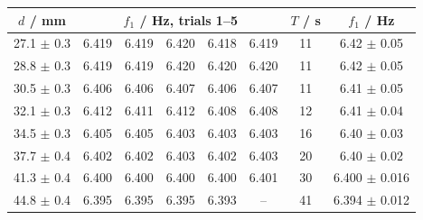 \begin{tabular}{@{}cccccccc@{}}
\toprule
$d$ / mm & \multicolumn{5}{c}{$f_1$ / Hz, trials 1--5} & $T$ / s & $f_1$ / Hz \\
\midrule
27.1 $\pm$ 0.3 & 6.419 & 6.419 & 6.420 & 6.418 & 6.419 & 11 & 6.42 $\pm$ 0.05 \\
28.8 $\pm$ 0.3 & 6.419 & 6.419 & 6.420 & 6.420 & 6.420 & 11 & 6.42 $\pm$ 0.05 \\
30.5 $\pm$ 0.3 & 6.406 & 6.406 & 6.407 & 6.406 & 6.407 & 11 & 6.41 $\pm$ 0.05 \\
32.1 $\pm$ 0.3 & 6.412 & 6.411 & 6.412 & 6.408 & 6.408 & 12 & 6.41 $\pm$ 0.04 \\
34.5 $\pm$ 0.3 & 6.405 & 6.405 & 6.403 & 6.403 & 6.403 & 16 & 6.40 $\pm$ 0.03 \\
37.7 $\pm$ 0.4 & 6.402 & 6.402 & 6.403 & 6.402 & 6.403 & 20 & 6.40 $\pm$ 0.02 \\
41.3 $\pm$ 0.4 & 6.400 & 6.400 & 6.400 & 6.400 & 6.401 & 30 & 6.400 $\pm$ 0.016 \\
44.8 $\pm$ 0.4 & 6.395 & 6.395 & 6.395 & 6.393 & -- & 41 & 6.394 $\pm$ 0.012 \\
\bottomrule
\end{tabular}